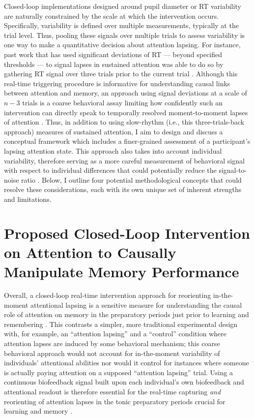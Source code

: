 Closed-loop implementations designed around pupil diameter or RT variability are naturally constrained by the scale at which the intervention occurs. Specifically, variability is defined over multiple measurements, typically at the trial level. Thus, pooling these signals over multiple trials to assess variability is one way to make a quantitative decision about attention lapsing. For instance, past work that has used significant deviations of RT --- beyond specified thresholds --- to signal lapses in sustained attention was able to do so by gathering RT signal over three trials prior to the current trial \parencite{debettencourt2019realtime}. Although this real-time triggering procedure is informative for understanding causal links between attention and memory, an approach using signal deviations at a scale of $n - 3$ trials is a coarse behavioral assay limiting how confidently such an intervention can directly speak to temporally resolved moment-to-moment lapses of attention \parencite[see][]{madore2020memory}. Thus, in addition to using slow-rhythm (i.e., this three-trials-back approach) measures of sustained attention, I aim to design and discuss a conceptual framework which includes a finer-grained assessment of a participant's lapsing attention state. This approach also takes into account individual variability, therefore serving as a more careful measurement of behavioral signal with respect to individual differences that could potentially reduce the signal-to-noise ratio \parencite[see][]{alkoby2018can}. Below, I outline four potential methodological concepts that could resolve these considerations, each with its own unique set of inherent strengths and limitations.

\section{Proposed Closed-Loop Intervention on Attention to Causally Manipulate Memory Performance}

Overall, a closed-loop real-time intervention approach for reorienting in-the-moment attentional lapsing is a sensitive measure for understanding the causal role of attention on memory in the preparatory periods just prior to learning and remembering \parencite{debettencourt2015closed}. This contrasts a simpler, more traditional experimental design with, for example, an \enquote{attention lapsing} and a \enquote{control} condition where attention lapses are induced by some behavioral mechanism; this coarse behavioral approach would not account for in-the-moment variability of individuals' attentional abilities \parencite{drew2008neural} nor would it control for instances where someone is actually paying attention on a supposed \enquote{attention lapsing} trial. Using a continuous biofeedback signal built upon each individual's own biofeedback and attentional readout is therefore essential for the real-time capturing \emph{and} reorienting of attention lapses in the tonic preparatory periods crucial for learning and memory \parencite{madore2020memory}.


